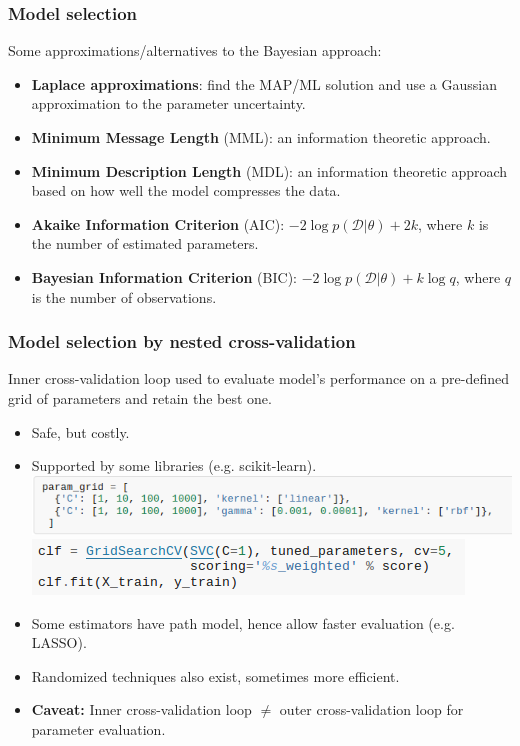 \begin{frame}
\frametitle{Model selection}
Some approximations/alternatives to the Bayesian approach:
\begin{itemize}
\item {\bf Laplace approximations}: find the MAP/ML solution and use a Gaussian approximation to the parameter uncertainty.
\item {\bf Minimum Message Length} (MML): an information theoretic approach.
\item {\bf Minimum Description Length} (MDL): an information theoretic approach based on how well the model compresses the data.
\item {\bf Akaike Information Criterion} (AIC): $-2\log p(\mathcal{D}|\theta) + 2 k$, where $k$ is the number of estimated parameters.
\item {\bf Bayesian Information Criterion} (BIC): $-2\log p(\mathcal{D}|\theta) + k\log q$, where $q$ is the number of observations.
\end{itemize}
\end{frame}

\begin{frame}
\frametitle{Model selection by nested cross-validation}

Inner cross-validation loop used to evaluate model's performance on a
pre-defined grid of parameters and retain the best one.

\begin{itemize}
\item Safe, but costly.
\item Supported by some libraries (e.g. scikit-learn).
\includegraphics[width=\textwidth]{sklearn_material/grid}\\
\includegraphics[width=.65\textwidth]{sklearn_material/grid_search}
\item Some estimators have path model, hence allow faster evaluation
  (e.g. LASSO).
\item Randomized techniques also exist, sometimes more efficient.
\item \textbf{Caveat:} Inner cross-validation loop $\neq$ outer
  cross-validation loop for parameter evaluation.
\end{itemize}
\end{frame} 

